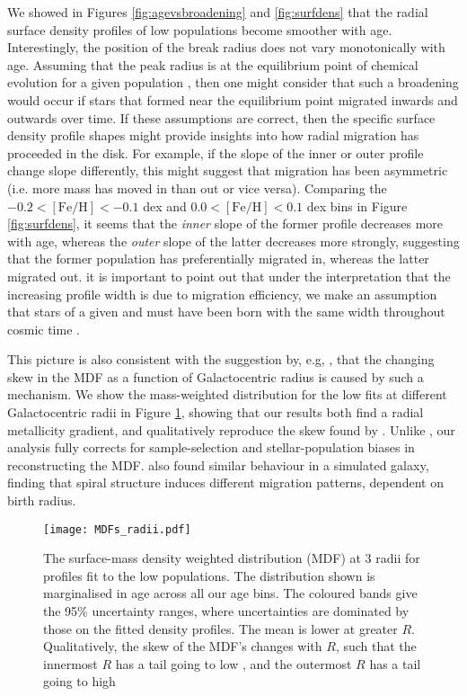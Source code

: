 We showed in Figures \ref{fig:agevsbroadening} and \ref{fig:surfdens}  that the radial surface density profiles of low \afe{} populations become smoother with age. Interestingly, the position of the break radius does not vary monotonically with age. Assuming that the peak radius is at the equilibrium point of chemical evolution for a given population  \citep[where the consumption of gas and its dilution are balanced, as discussed in][]{2016ApJ...823...30B}, then one might consider that such a broadening would occur if stars that formed near the equilibrium point migrated inwards and outwards over time.  If these assumptions are correct, then the specific surface density profile shapes might provide insights into how radial migration has proceeded in the disk. For example, if the slope of the inner or outer profile change slope differently, this might suggest that migration has been asymmetric (i.e. more mass has moved in than out or vice versa). Comparing the $-0.2 <\mathrm{[Fe/H]}<-0.1$ dex and $0.0 <\mathrm{[Fe/H]}<0.1$ dex bins in Figure \ref{fig:surfdens}, it seems that the \emph{inner} slope of the former profile decreases more with age, whereas the \emph{outer} slope of the latter decreases more strongly, suggesting that the former population has preferentially migrated in, whereas the latter migrated out.  it is important to point out that under the interpretation that the increasing profile width is due to migration efficiency, we make an assumption that stars of a given \feh{} and \afe{} must have been born with the same width throughout cosmic time \citep[as discussed by, e.g.][]{2017ApJ...834...27M}.


This picture is also consistent with the suggestion by, e.g, \citet[][]{2015ApJ...808..132H,2011ApJ...737....8L}, that the changing skew in the MDF as a function of Galactocentric radius is caused by such a mechanism. We show the mass-weighted \feh{} distribution for the low \afe{} fits at different Galactocentric radii in Figure \ref{fig:mdf}, showing that our results both find a radial metallicity gradient, and qualitatively reproduce the skew found by \citet[][]{2015ApJ...808..132H}. Unlike \citet[][]{2015ApJ...808..132H}, our analysis fully corrects for sample-selection and stellar-population biases in reconstructing the MDF. \citet{2016MNRAS.460L..94G} also found similar behaviour in a simulated galaxy, finding that spiral structure induces different migration patterns, dependent on birth radius. 

\begin{figure}
	\texttt{[image: MDFs\_radii.pdf]}
	\centering
   \caption{The surface-mass density weighted \feh{} distribution (MDF) at 3 radii for profiles fit to the low \afe{} populations. The distribution shown is marginalised in age across all our age bins. The coloured bands give the 95\% uncertainty ranges, where uncertainties are dominated by those on the fitted density profiles. The mean \feh{} is lower at greater $R$. Qualitatively, the skew of the MDF's changes with $R$, such that the innermost $R$ has a tail going to low \feh{}, and the outermost $R$ has a tail going to high \feh{}}
    \label{fig:mdf}
\end{figure}

